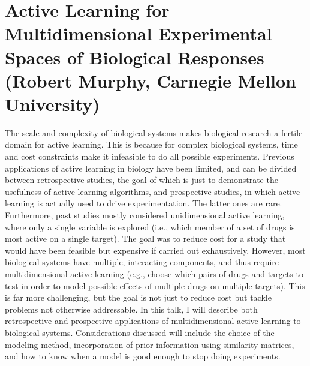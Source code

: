 \section{Active Learning for Multidimensional Experimental Spaces of Biological Responses (Robert Murphy, Carnegie Mellon University)}

The scale and complexity of biological systems makes biological research a fertile domain for active learning. This is because for complex biological systems, time and cost constraints make it infeasible to do all possible experiments. Previous applications of active learning in biology have been limited, and can be divided between retrospective studies, the goal of which is just to demonstrate the usefulness of active learning algorithms, and prospective studies, in which active learning is actually used to drive experimentation. The latter ones are rare. Furthermore, past studies mostly considered unidimensional active learning, where only a single variable is explored (i.e., which member of a set of drugs is most active on a single target). The goal was to reduce cost for a study that would have been feasible but expensive if carried out exhaustively. However, most biological systems have multiple, interacting components, and thus require multidimensional active learning (e.g., choose which pairs of drugs and targets to test in order to model possible effects of multiple drugs on multiple targets). This is far more challenging, but the goal is not just to reduce cost but tackle problems not otherwise addressable. In this talk, I will describe both retrospective and prospective applications of multidimensional active learning to biological systems. Considerations discussed will include the choice of the modeling method, incorporation of prior information using similarity matrices, and how to know when a model is good enough to stop doing experiments.